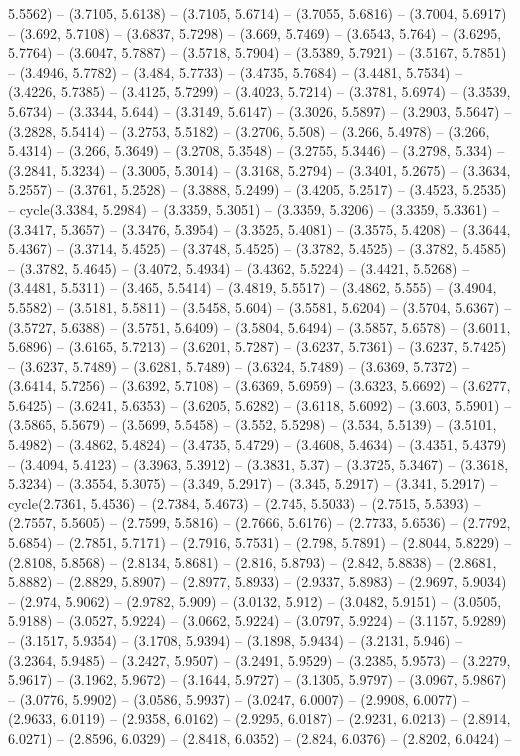 5.5562) -- (3.7105, 5.6138) -- (3.7105, 5.6714) -- (3.7055, 5.6816) -- (3.7004, 5.6917) -- (3.692, 5.7108) -- (3.6837, 5.7298) -- (3.669, 5.7469) -- (3.6543, 5.764) -- (3.6295, 5.7764) -- (3.6047, 5.7887) -- (3.5718, 5.7904) -- (3.5389, 5.7921) -- (3.5167, 5.7851) -- (3.4946, 5.7782) -- (3.484, 5.7733) -- (3.4735, 5.7684) -- (3.4481, 5.7534) -- (3.4226, 5.7385) -- (3.4125, 5.7299) -- (3.4023, 5.7214) -- (3.3781, 5.6974) -- (3.3539, 5.6734) -- (3.3344, 5.644) -- (3.3149, 5.6147) -- (3.3026, 5.5897) -- (3.2903, 5.5647) -- (3.2828, 5.5414) -- (3.2753, 5.5182) -- (3.2706, 5.508) -- (3.266, 5.4978) -- (3.266, 5.4314) -- (3.266, 5.3649) -- (3.2708, 5.3548) -- (3.2755, 5.3446) -- (3.2798, 5.334) -- (3.2841, 5.3234) -- (3.3005, 5.3014) -- (3.3168, 5.2794) -- (3.3401, 5.2675) -- (3.3634, 5.2557) -- (3.3761, 5.2528) -- (3.3888, 5.2499) -- (3.4205, 5.2517) -- (3.4523, 5.2535) -- cycle(3.3384, 5.2984) -- (3.3359, 5.3051) -- (3.3359, 5.3206) -- (3.3359, 5.3361) -- (3.3417, 5.3657) -- (3.3476, 5.3954) -- (3.3525, 5.4081) -- (3.3575, 5.4208) -- (3.3644, 5.4367) -- (3.3714, 5.4525) -- (3.3748, 5.4525) -- (3.3782, 5.4525) -- (3.3782, 5.4585) -- (3.3782, 5.4645) -- (3.4072, 5.4934) -- (3.4362, 5.5224) -- (3.4421, 5.5268) -- (3.4481, 5.5311) -- (3.465, 5.5414) -- (3.4819, 5.5517) -- (3.4862, 5.555) -- (3.4904, 5.5582) -- (3.5181, 5.5811) -- (3.5458, 5.604) -- (3.5581, 5.6204) -- (3.5704, 5.6367) -- (3.5727, 5.6388) -- (3.5751, 5.6409) -- (3.5804, 5.6494) -- (3.5857, 5.6578) -- (3.6011, 5.6896) -- (3.6165, 5.7213) -- (3.6201, 5.7287) -- (3.6237, 5.7361) -- (3.6237, 5.7425) -- (3.6237, 5.7489) -- (3.6281, 5.7489) -- (3.6324, 5.7489) -- (3.6369, 5.7372) -- (3.6414, 5.7256) -- (3.6392, 5.7108) -- (3.6369, 5.6959) -- (3.6323, 5.6692) -- (3.6277, 5.6425) -- (3.6241, 5.6353) -- (3.6205, 5.6282) -- (3.6118, 5.6092) -- (3.603, 5.5901) -- (3.5865, 5.5679) -- (3.5699, 5.5458) -- (3.552, 5.5298) -- (3.534, 5.5139) -- (3.5101, 5.4982) -- (3.4862, 5.4824) -- (3.4735, 5.4729) -- (3.4608, 5.4634) -- (3.4351, 5.4379) -- (3.4094, 5.4123) -- (3.3963, 5.3912) -- (3.3831, 5.37) -- (3.3725, 5.3467) -- (3.3618, 5.3234) -- (3.3554, 5.3075) -- (3.349, 5.2917) -- (3.345, 5.2917) -- (3.341, 5.2917) -- cycle(2.7361, 5.4536) -- (2.7384, 5.4673) -- (2.745, 5.5033) -- (2.7515, 5.5393) -- (2.7557, 5.5605) -- (2.7599, 5.5816) -- (2.7666, 5.6176) -- (2.7733, 5.6536) -- (2.7792, 5.6854) -- (2.7851, 5.7171) -- (2.7916, 5.7531) -- (2.798, 5.7891) -- (2.8044, 5.8229) -- (2.8108, 5.8568) -- (2.8134, 5.8681) -- (2.816, 5.8793) -- (2.842, 5.8838) -- (2.8681, 5.8882) -- (2.8829, 5.8907) -- (2.8977, 5.8933) -- (2.9337, 5.8983) -- (2.9697, 5.9034) -- (2.974, 5.9062) -- (2.9782, 5.909) -- (3.0132, 5.912) -- (3.0482, 5.9151) -- (3.0505, 5.9188) -- (3.0527, 5.9224) -- (3.0662, 5.9224) -- (3.0797, 5.9224) -- (3.1157, 5.9289) -- (3.1517, 5.9354) -- (3.1708, 5.9394) -- (3.1898, 5.9434) -- (3.2131, 5.946) -- (3.2364, 5.9485) -- (3.2427, 5.9507) -- (3.2491, 5.9529) -- (3.2385, 5.9573) -- (3.2279, 5.9617) -- (3.1962, 5.9672) -- (3.1644, 5.9727) -- (3.1305, 5.9797) -- (3.0967, 5.9867) -- (3.0776, 5.9902) -- (3.0586, 5.9937) -- (3.0247, 6.0007) -- (2.9908, 6.0077) -- (2.9633, 6.0119) -- (2.9358, 6.0162) -- (2.9295, 6.0187) -- (2.9231, 6.0213) -- (2.8914, 6.0271) -- (2.8596, 6.0329) -- (2.8418, 6.0352) -- (2.824, 6.0376) -- (2.8202, 6.0424) -- 